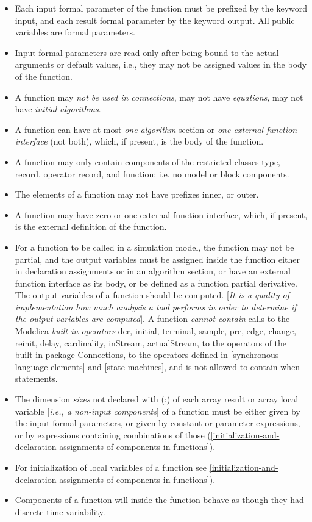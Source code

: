 \begin{itemize}
\item
  Each input formal parameter of the function must be prefixed by the
  keyword input, and each result formal parameter by the keyword output.
  All public variables are formal parameters.
\item
  Input formal parameters are read-only after being bound to the actual
  arguments or default values, i.e., they may not be assigned values in
  the body of the function.
\item
  A function may \emph{not be used in connections}, may not have
  \emph{equations}, may not have \emph{initial algorithms}.
\item
  A function can have at most \emph{one algorithm} section or \emph{one
  external function interface} (not both), which, if present, is the
  body of the function.
\item
  A function may only contain components of the restricted classes type,
  record, operator record, and function; i.e. no model or block
  components.
\item
  The elements of a function may not have prefixes inner, or outer.
\item
  A function may have zero or one external function interface, which, if
  present, is the external definition of the function.
\item
  For a function to be called in a simulation model, the function may
  not be partial, and the output variables must be assigned inside the
  function either in declaration assignments or in an algorithm section,
  or have an external function interface as its body, or be defined as a
  function partial derivative. The output variables of a function should
  be computed. {[}\emph{It is a quality of implementation how much
  analysis a tool performs in order to determine if the output variables
  are computed}{]}. A function \emph{cannot contain} calls to the
  Modelica \emph{built-in operators} der, initial, terminal, sample,
  pre, edge, change, reinit, delay, cardinality, inStream, actualStream,
  to the operators of the built-in package Connections, to the operators
  defined in \autoref{synchronous-language-elements} and \autoref{state-machines}, and is not allowed to contain
  when-statements.
\item
  The dimension \emph{sizes} not declared with (:) of each array result
  or array local variable {[}\emph{i.e., a non-input components}{]} of a
  function must be either given by the input formal parameters, or given
  by constant or parameter expressions, or by expressions containing
  combinations of those (\autoref{initialization-and-declaration-assignments-of-components-in-functions}).
\item
  For initialization of local variables of a function see \autoref{initialization-and-declaration-assignments-of-components-in-functions}).
\item
  Components of a function will inside the function behave as though
  they had discrete-time variability.
\end{itemize}

